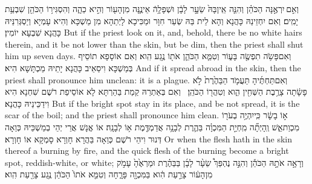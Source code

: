 {וְאִ֣ם \legarmeh  יִרְאֶ֣נָּה הַכֹּהֵ֗ן וְהִנֵּ֤ה אֵֽין\maqqaf בָּהּ֙ שֵׂעָ֣ר לָבָ֔ן וּשְׁפָלָ֥הֿ אֵינֶ֛נָּה מִן\maqqaf הָע֖וֹר וְהִ֣יא כֵהָ֑ה וְהִסְגִּיר֥וֹ הַכֹּהֵ֖ן שִׁבְעַ֥ת יָמִֽים׃}
{וְאִם יִחְזֵינַהּ כָּהֲנָא וְהָא לֵית בַּהּ שְׂעַר חִוָּר וּמַכִּיכָא לָיְתַהָא מִן מַשְׁכָּא וְהִיא עָמְיָא וְיַסְגְּרִנֵּיהּ כָּהֲנָא שִׁבְעָא יוֹמִין׃}
{But if the priest look on it, and, behold, there be no white hairs therein, and it be not lower than the skin, but be dim, then the priest shall shut him up seven days.}{}
{וְאִם\maqqaf פָּשֹׂ֥ה תִפְשֶׂ֖ה בָּע֑וֹר וְטִמֵּ֧א הַכֹּהֵ֛ן אֹת֖וֹ נֶ֥גַע הִֽוא׃}
{וְאִם אוֹסָפָא תוֹסֵיף בְּמַשְׁכָּא וִיסַאֵיב כָּהֲנָא יָתֵיהּ מַכְתָּשָׁא הִיא׃}
{And if it spread abroad in the skin, then the priest shall pronounce him unclean: it is a plague.}{}
{וְאִם\maqqaf תַּחְתֶּ֜יהָ תַּעֲמֹ֤ד הַבַּהֶ֙רֶת֙ לֹ֣א פָשָׂ֔תָה צָרֶ֥בֶת הַשְּׁחִ֖ין הִ֑וא וְטִהֲר֖וֹ הַכֹּהֵֽן׃ \setuma }
{וְאִם בְּאַתְרַהּ קַמַת בַּהַרְתָּא לָא אוֹסֵיפַת רֹשֶׁם שִׁחְנָא הִיא וִידַכֵּינֵיהּ כָּהֲנָא׃}
{But if the bright spot stay in its place, and be not spread, it is the scar of the boil; and the priest shall pronounce him clean.}{}
{א֣וֹ בָשָׂ֔ר כִּֽי\maqqaf יִהְיֶ֥ה בְעֹר֖וֹ מִכְוַת\maqqaf אֵ֑שׁ וְֽהָיְתָ֞ה מִֽחְיַ֣ת הַמִּכְוָ֗ה בַּהֶ֛רֶת לְבָנָ֥ה אֲדַמְדֶּ֖מֶת א֥וֹ לְבָנָֽה׃}
{אוֹ אֱנָשׁ אֲרֵי יְהֵי בְמַשְׁכֵּיהּ כְּוַאָה דְּנוּר וִיהֵי רֹשֶׁם כְּוַאָה בַּהֲרָא חָוְרָא סָמְקָא אוֹ חָוְרָא׃}
{Or when the flesh hath in the skin thereof a burning by fire, and the quick flesh of the burning become a bright spot, reddish-white, or white;}{}
{וְרָאָ֣ה אֹתָ֣הּ הַכֹּהֵ֡ן וְהִנֵּ֣ה נֶהְפַּךְ֩ שֵׂעָ֨ר לָבָ֜ן בַּבַּהֶ֗רֶת וּמַרְאֶ֙הָ֙ עָמֹ֣ק מִן\maqqaf הָע֔וֹר צָרַ֣עַת הִ֔וא בַּמִּכְוָ֖ה פָּרָ֑חָה וְטִמֵּ֤א אֹתוֹ֙ הַכֹּהֵ֔ן נֶ֥גַע צָרַ֖עַת הִֽוא׃}
